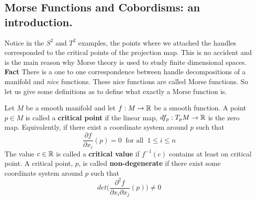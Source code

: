 \subsection{Morse Functions and Cobordisms: an introduction.}
Notice in the $S^{2}$ and $T^{2}$ examples, the points where we attached the handles corresponded to the critical points of the projection map. This is no accident and is the main reason why Morse theory is used to study finite dimensional spaces. \textbf{Fact} There is a one to one correspondence between handle decompositions of a manifold and \textit{nice} functions. These nice functions are called Morse functions. So let us give some definitions as to define what exactly a Morse function is.

\begin{definition}
Let $M$ be a smooth manifold and let $f:M\rightarrow \mathbb{R}$ be a smooth function. A point $p\in M$ is called a \textbf{critical point} if the linear map, $df_{p}:T_{p}M\rightarrow \mathbb{R}$ is the zero map. Equivalently, if there exist a coordinate system around $p$ such that 
\[
\frac{\partial f}{\partial x_{i}}(p) =0 ~ \text{ for all }~1\leq i \leq n
\]
The value $c\in \mathbb{R}$ is called a \textbf{critical value} if $f^{-1}(c)$ contains at least on critical point. A critical point, $p$, is called \textbf{non-degenerate} if there exist some coordinate system around $p$ such that 
\[
det\bigg( \frac{\partial^{2} f}{\partial x_{i}{\partial x_{j}}}(p)\bigg)\neq 0
\]
\end{definition}

